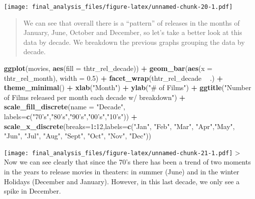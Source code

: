 \documentclass[]{article}
\newenvironment{Shaded}{\begin{snugshade}}{\end{snugshade}}
\newcommand{\DataTypeTok}[1]{\textcolor[rgb]{0.13,0.29,0.53}{#1}}
\newcommand{\DecValTok}[1]{\textcolor[rgb]{0.00,0.00,0.81}{#1}}
\newcommand{\FloatTok}[1]{\textcolor[rgb]{0.00,0.00,0.81}{#1}}
\newcommand{\KeywordTok}[1]{\textcolor[rgb]{0.13,0.29,0.53}{\textbf{#1}}}
\newcommand{\NormalTok}[1]{#1}
\newcommand{\OperatorTok}[1]{\textcolor[rgb]{0.81,0.36,0.00}{\textbf{#1}}}
\newcommand{\StringTok}[1]{\textcolor[rgb]{0.31,0.60,0.02}{#1}}
\begin{document}
\texttt{[image: final\_analysis\_files/figure-latex/unnamed-chunk-20-1.pdf]}

\begin{quote}
We can see that overall there is a ``pattern'' of releases in the months
of January, June, October and December, so let's take a better look at
this data by decade. We breakdown the previous graphs grouping the data
by decade.
\end{quote}

\begin{Shaded}
\begin{Highlighting}[]
\KeywordTok{ggplot}\NormalTok{(movies, }\KeywordTok{aes}\NormalTok{(}\DataTypeTok{fill =}\NormalTok{ thtr_rel_decade)) }\OperatorTok{+}\StringTok{ }\KeywordTok{geom_bar}\NormalTok{(}\KeywordTok{aes}\NormalTok{(}\DataTypeTok{x =}\NormalTok{ thtr_rel_month), }\DataTypeTok{width =} \FloatTok{0.5}\NormalTok{) }\OperatorTok{+}\StringTok{ }\KeywordTok{facet_wrap}\NormalTok{(thtr_rel_decade }\OperatorTok{~}\StringTok{ }\NormalTok{.) }\OperatorTok{+}\StringTok{ }\KeywordTok{theme_minimal}\NormalTok{() }\OperatorTok{+}\StringTok{ }\KeywordTok{xlab}\NormalTok{(}\StringTok{"Month"}\NormalTok{) }\OperatorTok{+}\StringTok{ }\KeywordTok{ylab}\NormalTok{(}\StringTok{"# of Films"}\NormalTok{) }\OperatorTok{+}\StringTok{ }\KeywordTok{ggtitle}\NormalTok{(}\StringTok{"Number of Films released per month each decade w/ breakdown"}\NormalTok{) }\OperatorTok{+}\StringTok{ }\KeywordTok{scale_fill_discrete}\NormalTok{(}\DataTypeTok{name =} \StringTok{"Decade"}\NormalTok{, }\DataTypeTok{labels=}\KeywordTok{c}\NormalTok{(}\StringTok{"70's"}\NormalTok{,}\StringTok{"80's"}\NormalTok{,}\StringTok{"90's"}\NormalTok{,}\StringTok{"00's"}\NormalTok{,}\StringTok{"10's"}\NormalTok{)) }\OperatorTok{+}\StringTok{ }\KeywordTok{scale_x_discrete}\NormalTok{(}\DataTypeTok{breaks=}\DecValTok{1}\OperatorTok{:}\DecValTok{12}\NormalTok{,}\DataTypeTok{labels=}\KeywordTok{c}\NormalTok{(}\StringTok{"Jan"}\NormalTok{, }\StringTok{"Feb"}\NormalTok{, }\StringTok{"Mar"}\NormalTok{, }\StringTok{"Apr"}\NormalTok{,}\StringTok{"May"}\NormalTok{, }\StringTok{"Jun"}\NormalTok{, }\StringTok{"Jul"}\NormalTok{, }\StringTok{"Aug"}\NormalTok{, }\StringTok{"Sept"}\NormalTok{, }\StringTok{"Oct"}\NormalTok{, }\StringTok{"Nov"}\NormalTok{, }\StringTok{"Dec"}\NormalTok{))}
\end{Highlighting}
\end{Shaded}

\texttt{[image: final\_analysis\_files/figure-latex/unnamed-chunk-21-1.pdf]}
\textgreater{} Now we can see clearly that since the 70's there has been
a trend of two moments in the years to release movies in theaters: in
summer (June) and in the winter Holidays (December and January).
However, in this last decade, we only see a spike in December.
\end{document}
